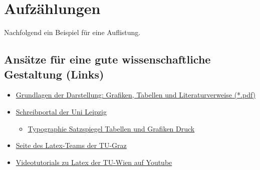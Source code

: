 \section{Aufzählungen}
\label{sec:auflistung}
Nachfolgend ein Beispiel für eine Auflistung.
\subsection{Ansätze für eine gute wissenschaftliche Gestaltung (Links)}
\label{sec:liste}
\begin{itemize}\small
	\item \href{https://timfrey.files.wordpress.com/2008/04/graph.pdf}{Grundlagen der Darstellung: Grafiken, Tabellen und Literaturverweise (*.pdf)}
	\item \href{http://home.uni-leipzig.de/schreibportal/layout-druck-2/}{Schreibportal der Uni Leipzig}
	\begin{itemize}\footnotesize
		\item \href{http://home.uni-leipzig.de/schreibportal/typographie/}{Typographie }\hspace{0.5cm}\href{http://home.uni-leipzig.de/schreibportal/satzspiegel/}{Satzspiegel }\hspace{0.5cm}\href{http://home.uni-leipzig.de/schreibportal/tabellen-grafiken/}{ Tabellen und Grafiken }\hspace{0.5cm}\href{http://home.uni-leipzig.de/schreibportal/druck/}{Druck}
	\end{itemize}
	\item \href{https://latex.tugraz.at/}{Seite des Latex-Teams der TU-Graz}
	\item \href{https://www.youtube.com/playlist?list=PLwlC-XZXtzhg4fQiZQAsXIMSRW-iZtnTQ}{Videotutorials zu Latex der TU-Wien auf Youtube}
\end{itemize}
\cleardoublepage